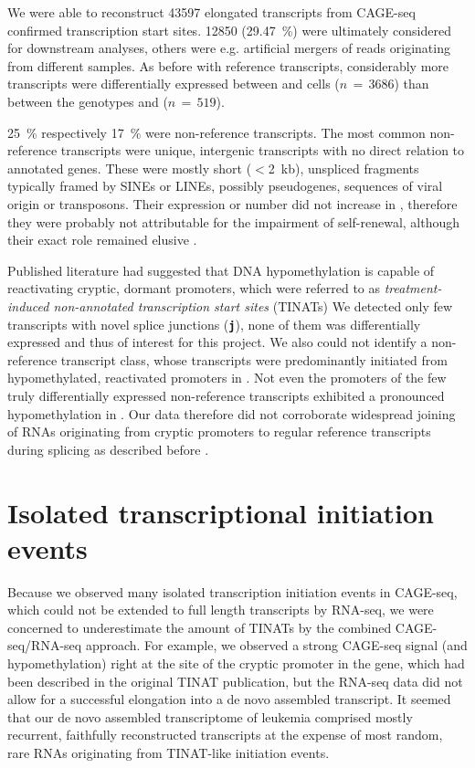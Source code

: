 We were able to reconstruct \num{43597} elongated transcripts from CAGE-seq confirmed transcription start sites. \num{12850} (\SI{29.47}{\percent}) were ultimately considered for downstream analyses, others were e.g. artificial mergers of reads originating from different samples. As before with reference transcripts, considerably more transcripts were differentially expressed between \kithi and \kitlow cells ($n\,=\,3686$) than between the genotypes \dnmtchip and \dnmtwt ($n\,=\,519$). 

\SI{25}{\percent} respectively \SI{17}{\percent} were non-reference transcripts. The most common non-reference transcripts were unique, intergenic transcripts with no direct relation to annotated genes. These were mostly short ($<$\SI{2}{\kilo b}), unspliced fragments typically framed by SINEs or LINEs, possibly pseudogenes, sequences of viral origin or transposons. Their expression or number did not increase in \dnmtchip, therefore they were probably not attributable for the impairment of self-renewal, although their exact role remained elusive \supple. 

Published literature had suggested that DNA hypomethylation is capable of reactivating cryptic, dormant promoters, which were referred to as \emph{treatment-induced non-annotated transcription start sites} (TINATs)\cite{Brocks2017}
We detected only few transcripts with novel splice junctions (\textbf{\texttt{j}}), none of them was differentially expressed and thus of interest for this project.  We also could not identify a non-reference transcript class, whose transcripts were predominantly initiated from hypomethylated, reactivated promoters in \dnmtchip \supple. Not even the promoters of the few truly differentially expressed non-reference transcripts exhibited a pronounced hypomethylation in \dnmtchip \supple. Our data therefore did not corroborate widespread joining of RNAs originating from cryptic promoters to regular reference transcripts during splicing as described before \cite{Brocks2017}.

\section{Isolated transcriptional initiation events}
\label{chap:r:tinats:denovolocalization}

Because we observed many isolated transcription initiation events in CAGE-seq, which could not be extended to full length transcripts by RNA-seq, we were concerned to underestimate the amount of TINATs by the combined CAGE-seq/RNA-seq approach. For example, we observed a strong CAGE-seq signal (and hypomethylation) right at the site of the cryptic promoter in the  gene, which had been described in the original TINAT publication\cite{Brocks2017}, but the RNA-seq data did not allow for a successful elongation into a de novo assembled transcript. It seemed that our de novo assembled transcriptome of \mllafnine leukemia comprised mostly recurrent, faithfully reconstructed transcripts at the expense of most random, rare RNAs originating from TINAT-like initiation events.

